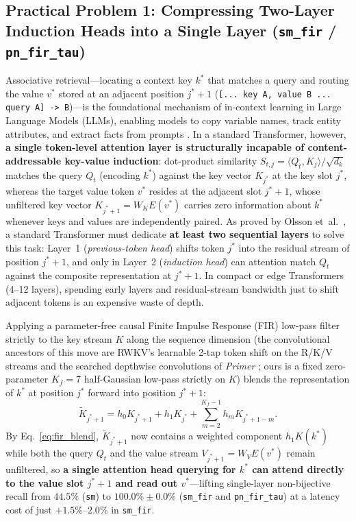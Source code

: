 \documentclass[11pt,a4paper]{article}
\begin{document}
\subsection{Practical Problem 1: Compressing Two-Layer Induction Heads into a Single Layer (\texttt{sm\_fir} / \texttt{pn\_fir\_tau})}

Associative retrieval---locating a context key $k^*$ that matches a query and routing the value $v^*$ stored at an adjacent position $j^*+1$ (\texttt{[... key A, value B ... query A] -> B})---is the foundational mechanism of in-context learning in Large Language Models (LLMs), enabling models to copy variable names, track entity attributes, and extract facts from prompts \cite{olsson2022induction}. In a standard Transformer, however, \textbf{a single token-level attention layer is structurally incapable of content-addressable key-value induction}: dot-product similarity $S_{t,j} = \langle Q_t, K_j \rangle / \sqrt{d_k}$ matches the query $Q_t$ (encoding $k^*$) against the key vector $K_{j^*}$ at the key slot $j^*$, whereas the target value token $v^*$ resides at the adjacent slot $j^*+1$, whose unfiltered key vector $K_{j^*+1} = W_K E(v^*)$ carries zero information about $k^*$ whenever keys and values are independently paired. As proved by Olsson et~al.\ \cite{olsson2022induction}, a standard Transformer must dedicate \textbf{at least two sequential layers} to solve this task: Layer~1 (\emph{previous-token head}) shifts token $j^*$ into the residual stream of position $j^*+1$, and only in Layer~2 (\emph{induction head}) can attention match $Q_t$ against the composite representation at $j^*+1$. In compact or edge Transformers (4--12 layers), spending early layers and residual-stream bandwidth just to shift adjacent tokens is an expensive waste of depth.

Applying a parameter-free causal Finite Impulse Response (FIR) low-pass filter strictly to the key stream $K$ along the sequence dimension (the convolutional ancestors of this move are RWKV's learnable 2-tap token shift \cite{peng2023rwkv} on the R/K/V streams and the searched depthwise convolutions of \emph{Primer} \cite{so2021primer}; ours is a fixed zero-parameter $K_f=7$ half-Gaussian low-pass strictly on $K$) blends the representation of $k^*$ at position $j^*$ forward into position $j^*+1$:
\begin{equation}
\label{eq:fir_blend}
\tilde{K}_{j^*+1} = h_0 K_{j^*+1} + h_1 K_{j^*} + \sum_{m=2}^{K_f-1} h_m K_{j^*+1-m}.
\end{equation}
By Eq.~\eqref{eq:fir_blend}, $\tilde{K}_{j^*+1}$ now contains a weighted component $h_1 K(k^*)$ while both the query $Q_t$ and the value stream $V_{j^*+1} = W_V E(v^*)$ remain unfiltered, so \textbf{a single attention head querying for $k^*$ can attend directly to the value slot $j^*+1$ and read out $v^*$}---lifting single-layer non-bijective recall from $44.5\%$ (\texttt{sm}) to $100.0\% \pm 0.0\%$ (\texttt{sm\_fir} and \texttt{pn\_fir\_tau}) at a latency cost of just $+1.5\%\text{--}2.0\%$ in \texttt{sm\_fir}.
\end{document}
